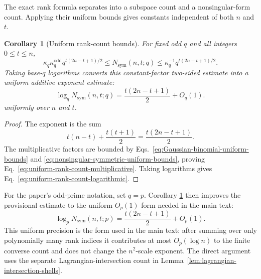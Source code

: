 \documentclass[11pt]{article}
\newcommand{\1}{\mathbf 1}
\theoremstyle{plain}
\newtheorem{corollary}[theorem]{Corollary}
\theoremstyle{definition}
\theoremstyle{remark}
\begin{document}
The exact rank formula separates into a subspace count and a nonsingular-form
count.  Applying their uniform bounds gives constants independent of both
$n$ and $t$.

\begin{corollary}[Uniform rank-count bounds]
\label{cor:uniform-symmetric-rank-count}
For fixed odd $q$ and all integers $0\le t\le n$,
\begin{equation}
  \kappa_q\kappa_q^{\mathrm{odd}}
  q^{t(2n-t+1)/2}
  \le
  N_{\mathrm{sym}}(n,t;q)
  \le
  \kappa_q^{-1}
  q^{t(2n-t+1)/2}.
  \label{eq:uniform-rank-count-multiplicative}
\end{equation}
Taking base-$q$ logarithms converts this constant-factor two-sided estimate
into a uniform additive exponent estimate:
\begin{equation}
  \log_qN_{\mathrm{sym}}(n,t;q)
  =\frac{t(2n-t+1)}2+O_q(1).
  \label{eq:uniform-rank-count-logarithmic}
\end{equation}
uniformly over $n$ and $t$.
\end{corollary}

\begin{proof}
The exponent is the sum
\begin{equation}
  t(n-t)+\frac{t(t+1)}2
  =\frac{t(2n-t+1)}2.
  \label{eq:rank-count-exponent-identity}
\end{equation}
The multiplicative factors are bounded by
Eqs.~\eqref{eq:Gaussian-binomial-uniform-bounds} and
\eqref{eq:nonsingular-symmetric-uniform-bounds}, proving
Eq.~\eqref{eq:uniform-rank-count-multiplicative}.  Taking logarithms gives
Eq.~\eqref{eq:uniform-rank-count-logarithmic}.
\end{proof}

For the paper's odd-prime notation, set $q=p$.  Corollary
\ref{cor:uniform-symmetric-rank-count} then improves the provisional estimate
to the uniform $O_p(1)$ form needed in the main text:
\begin{equation}
  \log_pN_{\mathrm{sym}}(n,t;p)
  =\frac{t(2n-t+1)}2+O_p(1).
  \label{eq:paper-uniform-rank-count}
\end{equation}
This uniform precision is the form used in the main text: after summing over
only polynomially many rank indices it contributes at most $O_p(\log n)$ to
the finite converse count and does not change the $n^2$-scale exponent.  The
direct argument uses the separate Lagrangian-intersection count in
Lemma~\ref{lem:lagrangian-intersection-shells}.
\end{document}
